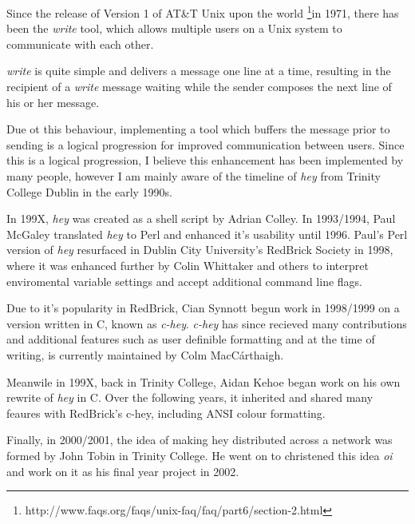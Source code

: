 Since the release of Version 1 of AT\&T Unix upon the world 
\footnote{http://www.faqs.org/faqs/unix-faq/faq/part6/section-2.html}{in 1971}, 
there has been the \emph{write} tool, which allows multiple users on a Unix 
system to communicate with each other.


\emph{write} is quite simple and delivers a message one line at a time,
resulting in the recipient of a \emph{write} message waiting while the
sender composes the next line of his or her message.


Due ot this behaviour, implementing a tool which buffers the message
prior to sending is a logical progression for improved communication
between users. Since this is a logical progression, I believe this
enhancement has been implemented by many people, however I am mainly
aware of the timeline of \emph{hey} from Trinity College Dublin in 
the early 1990s.


In 199X, \emph{hey} was created as a shell script by Adrian Colley. In 
1993/1994, Paul McGaley translated \emph{hey} to Perl and enhanced it's 
usability until 1996. Paul's Perl version of \emph{hey} resurfaced in 
Dublin City University's RedBrick Society in 1998, where it was enhanced
further by Colin Whittaker and others to interpret enviromental variable 
settings and accept additional command line flags.


Due to it's popularity in RedBrick, Cian Synnott begun work in 1998/1999
on a version written in C, known as \emph{c-hey}. \emph{c-hey} has since
recieved many contributions and additional features such as user
definible formatting and at the time of writing, is currently maintained 
by Colm MacC\'{a}rthaigh.


Meanwile in 199X, back in Trinity College, Aidan Kehoe began work on his
own rewrite of \emph{hey} in C. Over the following years, it inherited 
and shared many feaures with RedBrick's c-hey, including ANSI colour
formatting.


Finally, in 2000/2001, the idea of making hey distributed across a
network was formed by John Tobin in Trinity College. He went on to 
christened this idea \emph{oi} and work on it as his final year project
in 2002. 
